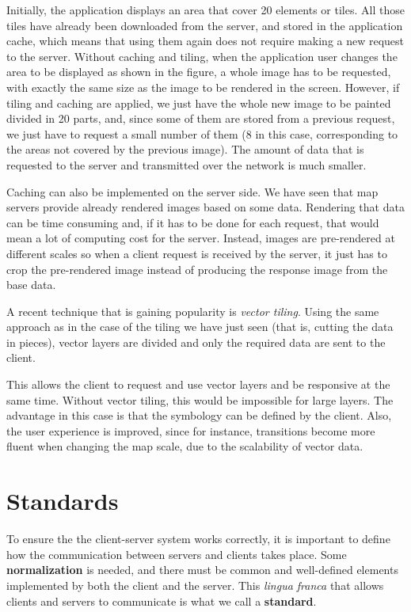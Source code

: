 Initially, the application displays an area that cover 20 elements or tiles. All those tiles have already been downloaded from the server, and stored in the application cache, which means that using them again does not require making a new request to the server. Without caching and tiling, when the application user changes the area to be displayed as shown in the figure, a whole image has to be requested, with exactly the same size as the image to be rendered in the screen. However, if tiling and caching are applied, we just have the whole new image to be painted divided in 20 parts, and, since some of them are stored from a previous request, we just have to request a small number of them (8 in this case, corresponding to the areas not covered by the previous image). The amount of data that is requested to the server and transmitted over the network is much smaller.

Caching can also be implemented on the server side. We have seen that map servers provide already rendered images based on some data. Rendering that data can be time consuming and, if it has to be done for each request, that would mean a lot of computing cost for the server. Instead, images are pre-rendered at different scales so when a client request is received by the server, it just has to crop the pre-rendered image instead of producing the response image from the base data.

A recent technique that is gaining popularity is \emph{vector tiling}. Using the same approach as in the case of the tiling we have just seen (that is, cutting the data in pieces), vector layers are divided and only the required data are sent to the client.

This allows the client to request and use vector layers and be responsive at the same time. Without vector tiling, this would be impossible for large layers. The advantage in this case is that the symbology can be defined by the client. Also, the user experience is improved, since for instance, transitions become more fluent when changing the map scale, due to the scalability of vector data.




\section{Standards}

To ensure the the client-server system works correctly, it is important to define how the communication between servers and clients takes place. Some \textbf{normalization} is needed, and there must be common and well-defined elements implemented by both the client and the server. This \emph{lingua franca} that allows clients and servers to communicate is what we call a \textbf{standard}.

